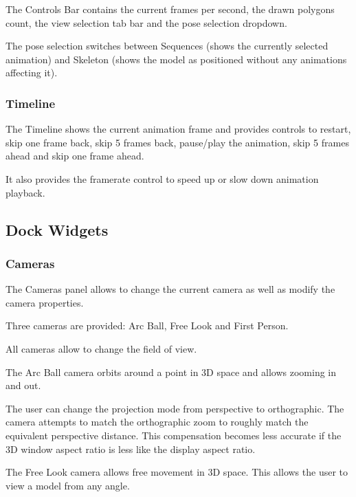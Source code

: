 \documentclass[10pt, a4paper, titlepage, oneside]{article}
\begin{document}
The Controls Bar contains the current frames per second, the drawn polygons count, the view selection tab bar and the pose selection dropdown.

The pose selection switches between Sequences (shows the currently selected animation) and Skeleton (shows the model as positioned without any animations affecting it).

\subsubsection{Timeline}

The Timeline shows the current animation frame and provides controls to restart, skip one frame back, skip 5 frames back, pause/play the animation, skip 5 frames ahead and skip one frame ahead.

It also provides the framerate control to speed up or slow down animation playback.

\newpage

\subsection{Dock Widgets}

\setlength{\parindent}{0cm}

\subsubsection{Cameras}

The Cameras panel allows to change the current camera as well as modify the camera properties.

\vspace{\baselineskip}
Three cameras are provided: Arc Ball, Free Look and First Person.

\vspace{\baselineskip}
All cameras allow to change the field of view.

\vspace{\baselineskip}
The Arc Ball camera orbits around a point in 3D space and allows zooming in and out.

\vspace{\baselineskip}
The user can change the projection mode from perspective to orthographic. The camera attempts to match the orthographic zoom to roughly match the equivalent perspective distance. This compensation becomes less accurate if the 3D window aspect ratio is less like the display aspect ratio.

\vspace{\baselineskip}
The Free Look camera allows free movement in 3D space. This allows the user to view a model from any angle.
\end{document}
